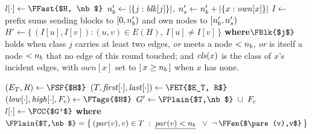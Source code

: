 \documentclass[11pt]{article}
\begin{document}
\begin{algorithm}[t]
\caption{\textsc{compress-graph} \textsc{Algorithm}}\label{alg:comp}
$l[\cdot] \gets \FFast{$H, \nb$}$ 
$n_b' \gets |\{j : \mathit{blk}[j]\}|$, \quad
  $n_s' \gets n_b' + |\{x : \mathit{own}[x]\}|$\;
$I \gets$ prefix sums sending blocks to $[0,n_b')$ and own nodes to
  $[n_b',n_s')$\;
$H' \gets \{\,(I[u],I[v]) : (u,v) \in E(H),\ I[u] \neq I[v]\,\}$\;
\BlankLine
\textbf{where}\quad $\FBlk{$j$}$ holds when class $j$ carries at least two
edges, \emph{or} meets a node $<n_b$, \emph{or} is itself a node $<n_b$ that no
edge of this round touched; and $\mathit{cls}(x)$ is the class of $x$'s incident edges,
with $\mathit{own}[x]$ set to $[\,x \ge n_b\,]$ when $x$ has none.
\end{algorithm}

\begin{algorithm}[t]
\caption{\textsc{fast-bcc}$^{+}$ \textsc{Algorithm}}\label{alg:fast}
$(E_T, R) \gets \FSF{$H$}$ 
$(T,\mathit{first}[\cdot],\mathit{last}[\cdot]) \gets \FET{$E_T, R$}$\;
$(\mathit{low}[\cdot],\mathit{high}[\cdot],F_c) \gets \FTags{$H$}$\;
$G' \gets \FPlain{$T,\nb$}\; \cup\; F_c$ 
$l[\cdot] \gets \FCC{$G'$}$ 
\BlankLine
\textbf{where}\quad
$\FPlain{$T,\nb$} = \bigl\{\,(\pare(v),v) \in T \;:\;
   \underline{\pare(v) < \nb}\;\ \vee\ \neg\,\FFen{$\pare(v),v$}\,\bigr\}$
\end{algorithm}

\end{document}
